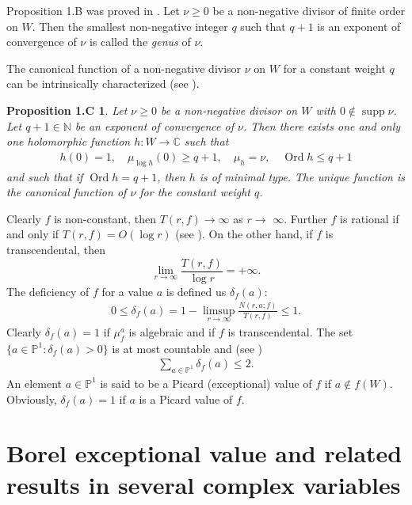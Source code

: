 \documentclass[11pt,reqno]{amsart}
\newtheorem*{propo1C}{Proposition 1.C}
\numberwithin{equation}{section}
\begin{document}
Proposition 1.B was proved in \cite{Stoll-1953}. Let $\nu\geq 0$ be a non-negative divisor of finite order on $W$. Then the smallest non-negative integer $q$ such that $q+1$ is an exponent of convergence of $\nu$ is called the \emph{genus} of $\nu$.

The canonical function of a non-negative divisor $\nu$ on $W$ for a constant weight $q$ can be intrinsically characterized (see \cite[Proposition 6.4]{Stoll-1974}).
\begin{propo1C}\cite[Theorem 3]{Ronkin-1968} Let $\nu\geq 0$ be a non-negative divisor on $W$ with $0\notin \operatorname{supp}\nu$.
Let $q+1\in\mathbb{N}$ be an exponent of convergence of $\nu$. Then there exists one and only one holomorphic function
$h:W\to\mathbb{C}$ such that
\begin{align*}
h(0)=1,\quad\mu_{\log h}(0)\ge q+1,\quad \mu_h=\nu,\quad\operatorname{Ord} h \le q+1
\end{align*}
and such that if $\operatorname{Ord} h=q+1$, then $h$ is of minimal type. The unique function is the canonical function of $\nu$ for the constant weight $q$.
\end{propo1C}

Clearly $f$ is non-constant, then $T(r, f) \rightarrow \infty$ as $r \rightarrow$ $\infty$. Further $f$ is rational if and only if $T(r,f)=O(\log r)$ (see \cite[pp. 19]{Stoll-1974}).
On the other hand, if $f$ is transcendental, then 
\[\lim\limits_{r \rightarrow \infty} \frac{T(r, f)}{\log r}=+\infty.\] 
The deficiency of $f$ for a value $a$ is defined us $\delta_f(a)$:
\begin{align*}
0\leq \delta_f(a)=1-\limsup\limits_{r\to \infty}\frac{N(r,a;f)}{T(r,f)}\leq 1.
\end{align*}
Clearly $\delta_f(a)=1$ if $\mu^a_f$ is algebraic and if $f$ is transcendental. The set $\{a\in\mathbb{P}^1:\delta_f(a)>0\}$ is at most countable and (see \cite[pp. 20]{Stoll-1974})
\begin{align*}
\sum\limits_{a\in\mathbb{P}^1} \delta_f(a)\leq 2.
\end{align*}
An element $a\in \mathbb{P}^1$ is said to be a Picard (exceptional) value of $f$ if $a\not\in f(W)$. Obviously, $\delta_f(a)=1$ if $a$ is a Picard value of $f$.


\section{{\bf Borel exceptional value and related results in several complex variables}}
\end{document}
